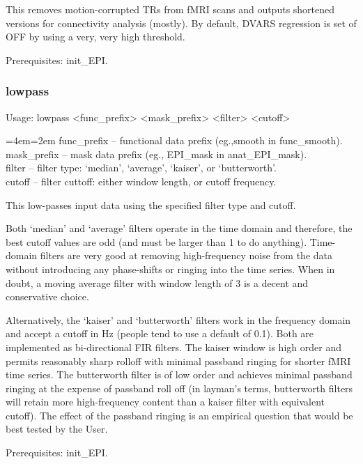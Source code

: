 \documentclass[final,titlepage,letterpaper,oneside,12pt]{article}
\renewcommand{\texttt}[2][BrickRed]{\textcolor{#1}{\ttfamily #2}}%
\newenvironment{blockquote}{%
  \par%
  \medskip
  \leftskip=4em\rightskip=2em%
  \noindent\ignorespaces}{%
  \par\medskip}
\begin{document}
\noindent This removes motion-corrupted TRs from fMRI scans and outputs shortened versions for connectivity analysis (mostly). By default, DVARS regression is set of OFF by using a very, very high threshold.

Prerequisites: \texttt{init\_EPI}.

\subsubsection{lowpass}
Usage: \texttt{lowpass <func\_prefix> <mask\_prefix> <filter> <cutoff>}

\begin{blockquote}
func\_prefix -- functional data prefix (eg.,smooth in func\_smooth). \\
mask\_prefix -- mask data prefix (eg., EPI\_mask in anat\_EPI\_mask). \\
filter -- filter type: `median', `average', `kaiser', or `butterworth'. \\
cutoff -- filter cuttoff: either window length, or cutoff frequency. \
\end{blockquote}

\noindent This low-passes input data using the specified filter type and cutoff. 

Both `median' and `average' filters operate in the time domain and therefore, the best cutoff values are odd (and must be larger than 1 to do anything). Time-domain filters are very good at removing high-frequency noise from the data without introducing any phase-shifts or ringing into the time series. When in doubt, a moving average filter with window length of 3 is a decent and conservative choice.

Alternatively, the `kaiser' and `butterworth' filters work in the frequency domain and accept a cutoff in Hz (people tend to use a default of 0.1). Both are implemented as bi-directional FIR filters. The kaiser window is high order and permits reasonably sharp rolloff with minimal passband ringing for shorter fMRI time series. The butterworth filter is of low order and achieves minimal passband ringing at the expense of passband roll off (in layman's terms, butterworth filters will retain more high-frequency content than a kaiser filter with equivalent cutoff). The effect of the passband ringing is an empirical question that would be best tested by the User.

Prerequisites: \texttt{init\_EPI}.
\end{document}
